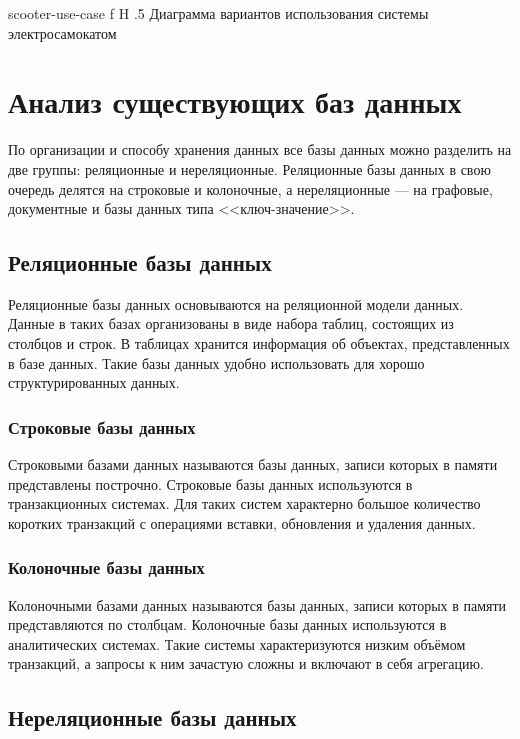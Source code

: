     {scooter-use-case}
    {f}
    {H}
    {.5\textwidth}
    {Диаграмма вариантов использования системы электросамокатом}

\section{Анализ существующих баз данных}

По организации и способу хранения данных все базы данных можно разделить на две группы: реляционные и нереляционные. Реляционные базы данных в свою очередь делятся на строковые и колоночные, а нереляционные --- на графовые, документные и базы данных типа <<ключ-значение>>.

\subsection{Реляционные базы данных}

Реляционные базы данных основываются на реляционной модели данных. Данные в таких базах организованы в виде набора таблиц, состоящих из столбцов и строк. В таблицах хранится информация об объектах, представленных в базе данных. Такие базы данных удобно использовать для хорошо структурированных данных.

\subsubsection{Строковые базы данных}

Строковыми базами данных называются базы данных, записи которых в памяти представлены построчно. Строковые базы данных используются в транзакционных системах. Для таких систем характерно большое количество коротких транзакций с операциями вставки, обновления и удаления данных.

\subsubsection{Колоночные базы данных}

Колоночными базами данных называются базы данных, записи которых в памяти представляются по столбцам. Колоночные базы данных используются в аналитических системах. Такие системы характеризуются низким объёмом транзакций, а запросы к ним зачастую сложны и включают в себя агрегацию.

\subsection{Нереляционные базы данных}

